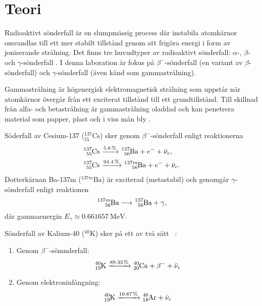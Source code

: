 \section{Teori} \label{sec:theory}

Radioaktivt sönderfall är en slumpmässig process där instabila atomkärnor
omvandlas till ett mer stabilt tillstånd genom att frigöra energi i form av
joniserande strålning. Det finns tre huvudtyper av radioaktivt sönderfall:
$\alpha$-, $\beta$- och $\gamma$-sönderfall \parencite{yf}. I denna laboration
är fokus på $\beta^-$-sönderfall (en variant av $\beta$-sönderfall) och
$\gamma$-sönderfall (även känd som gammastrålning).

Gammastrålning är högenergisk elektromagnetisk strålning som uppstår när
atomkärnor övergår från ett exciterat tillstånd till ett grundtillstånd. Till
skillnad från alfa- och betastrålning är gammastrålning oladdad och kan
penetrera material som papper, plast och i viss mån bly
\parencite{spectrometry}.

Söderfall av Cesium-137 ($^{137}_{55}\text{Cs}$) sker genom
$\beta^-$-sönderfall enligt reaktionerna
%
\begin{align}
    \ce{^137_55Cs} &\xrightarrow{\qty{5.6}{\percent}}  \ce{^137_56Ba} + e^- + \bar{\nu}_e,   \label{csdecay1} \\
    \ce{^137_55Cs} &\xrightarrow{\qty{94.4}{\percent}} \ce{^{137m}_56Ba} + e^- + \bar{\nu}_e \label{csdecay2}.
\end{align}
%
Dotterkärnan Ba-137m ($^{137m}\text{Ba}$) är exciterad (metastabil) och
genomgår $\gamma$-sönderfall enligt reaktionen
%
\begin{equation}
    \ce{^{137m}_56Ba} \longrightarrow \ce{^137_56Ba} + \gamma \label{badecay},
\end{equation}
%
där gammaenergin $E_\gamma \approx \qty{0.661657}{\MeV}$.

Sönderfall av Kalium-40 ($^{40}\text{K}$) sker på ett av två sätt
\parencite{nuclear}~\parencite{instructions}:
%
\begin{enumerate}
    \item Genom $\beta^-$-sömnderfall:
    \begin{equation}
        \ce{^40_19K} \xrightarrow{\qty{89.33}{\percent}} \ce{^40_20Ca} + \beta^- + \bar{\nu}_e \label{kdecay1}
    \end{equation}

    \item Genom elektroninfångning:
    \begin{equation}
        \ce{^40_19K} \xrightarrow{\qty{10.67}{\percent}} \ce{^40_18Ar} + \bar{\nu}_e           \label{kdecay2}
    \end{equation}
\end{enumerate}

